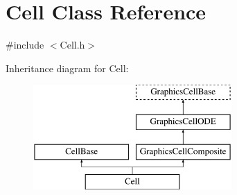 \hypertarget{class_cell}{\section{\-Cell \-Class \-Reference}
\label{class_cell}
}


{\ttfamily \#include $<$\-Cell.\-h$>$}

\-Inheritance diagram for \-Cell\-:\begin{figure}[H]
\begin{center}
\leavevmode
\includegraphics[height=4.000000cm]{class_cell}
\end{center}
\end{figure}
